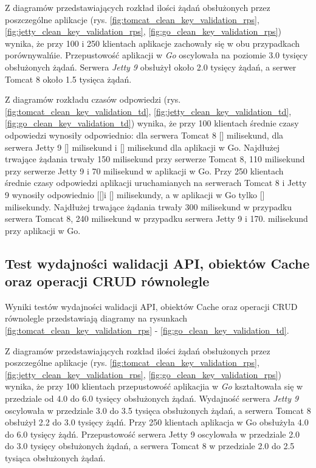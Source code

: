 Z diagramów przedstawiających rozkład ilości żądań obsłużonych przez poszczególne aplikacje  (rys. \ref{fig:tomcat_clean_key_validation_rps}, \ref{fig:jetty_clean_key_validation_rps}, \ref{fig:go_clean_key_validation_rps}) wynika, że przy 100 i 250 klientach aplikacje zachowały się w obu przypadkach porównywalńie. Przepustowość aplikacji w \textsl{Go} oscylowała na poziomie 3.0 tysięcy obsłużonych żądań. Serwera \textsl{Jetty 9} obsłużył około 2.0 tysięcy  żądań, a serwer Tomcat 8 około 1.5 tysięca żądań.


Z diagramów rozkładu czasów odpowiedzi (rys. \ref{fig:tomcat_clean_key_validation_td}, \ref{fig:jetty_clean_key_validation_td}, \ref{fig:go_clean_key_validation_td}) wynika, że przy 100 klientach średnie czasy odpowiedzi wynosiły odpowiednio: dla serwera Tomcat 8 [] milisekund, dla serwera Jetty 9 [] milisekund i [] milisekund dla aplikacji w Go.  Najdłużej trwające żądania trwały 150 milisekund przy serwerze Tomcat 8, 110 milisekund przy serwerze  Jetty 9 i 70 milisekund  w aplikacji w Go. Przy 250 klientach średnie czasy odpowiedzi aplikacji uruchamianych na serwerach Tomcat 8 i Jetty 9  wynosiły odpowiednio [[]i [] milisekundy, a w aplikacji w Go tylko [] milisekundy. Najdłużej trwające żądania trwały 300 milisekund w przypadku serwera Tomcat 8, 240 milisekund w przypadku serwera Jetty 9 i 170. milisekund przy aplikacji w Go. 


\clearpage

\subsection{Test wydajności walidacji API, obiektów Cache oraz operacji CRUD równolegle }

Wyniki testów wydajności walidacji API, obiektów Cache oraz operacji CRUD równolegle przedstawiają diagramy na rysunkach \ref{fig:tomcat_clean_key_validation_rps} - \ref{fig:go_clean_key_validation_td}.              

Z diagramów przedstawiających rozkład ilości żądań obsłużonych przez poszczególne aplikacje  (rys. \ref{fig:tomcat_clean_key_validation_rps}, \ref{fig:jetty_clean_key_validation_rps}, \ref{fig:go_clean_key_validation_rps}) wynika, że przy 100 klientach przepustowość aplikacjia w \textsl{Go} kształtowała się w przedziale od 4.0 do 6.0 tysięcy obsłużonych żądań. Wydajność serwera \textsl{Jetty 9} oscylowała w przedziale 3.0 do 3.5 tysięca obsłużonych żądań, a  serwera Tomcat 8 obsłużył 2.2 do 3.0 tysięcy żądń. Przy 250 klientach aplikacja w Go obsłużyła 4.0 do 6.0 tysięcy żądń. Przepustowość serwera Jetty 9 oscylowała w przedziale 2.0 do 3.0 tysięcy obsłużonych żądań, a serwera Tomcat 8 w przedziale 2.0 do 2.5 tysiąca obsłużonych żądań.



